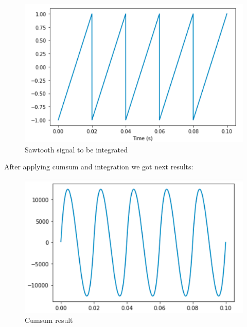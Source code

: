 \documentclass[a4paper]{article}
\begin{document}
        \begin{figure}[H]
            \centering
            \includegraphics[width=\textwidth]{img/p4_1.png}
            \caption{Sawtooth signal to be integrated}
            \label{fig:part1_1_2}
        \end{figure}

        After applying cumsum and integration we got next results:
        
        \begin{figure}[H]
            \centering
            \includegraphics[width=\textwidth]{img/p4_2.png}
            \caption{Cumsum result}
            \label{fig:part1_1_2}
        \end{figure}
        
\end{document}
